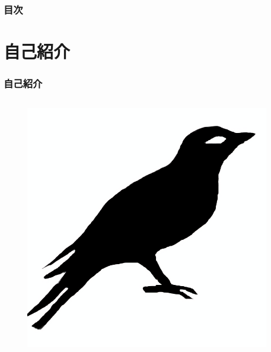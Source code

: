 \frame{\maketitle}

\begin{frame}
  \frametitle{目次}

  \tableofcontents
\end{frame}

\section{自己紹介}
\begin{frame}
  \frametitle{自己紹介}
  
  \begin{columns}
    \begin{column}{0.3\textwidth}
      \centering
      \begin{figure}
        \includegraphics[width=0.95\textwidth]{img/bird2x.png}
      \end{figure}


\end{column}
\end{columns}
\end{frame}
